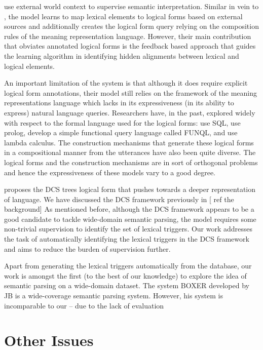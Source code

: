 \documentclass[11pt]{article}
\begin{document}
\cite{CGCR10, CGRR11} use external world context to supervise semantic interpretation. Similar in vein to \cite{CM08, LJK09}, the \cite{CGCR10} model learns to map lexical elements to logical forms based on external sources and additionally creates the logical form query relying on the composition rules of the meaning representation language. However, their main contribution that obviates annotated logical forms is the feedback based approach that guides the learning algorithm in identifying hidden alignments between lexical and logical elements.

An important limitation of the \cite{CGCR10} system is that although it does require explicit logical form annotations, their model still relies on the framework of the meaning representations language which lacks in its expressiveness (in its ability to express) natural language queries. Researchers have, in the past, explored widely with respect to the formal language used for the logical forms: \cite{GM09} use SQL, \cite{ZM96,TM01} use prolog, \cite{KWM05}  develop a simple functional query language called {\sc FUN}QL, and \cite{ZC05} use lambda calculus. The construction mechanisms that generate these logical forms in a compositional manner from the utterances have also been quite diverse. The logical forms and the construction mechanisms are in sort of orthogonal problems and hence the expressiveness of these models vary to a good degree.

\cite{LJK11} proposes the DCS trees logical form that pushes towards a deeper representation of language. %
We have discussed the DCS framework previously in [ ref the background]
As mentioned before, although the DCS framework appears to be a good candidate to tackle wide-domain semantic parsing, the model requires some non-trivial supervision to identify the set of lexical triggers.
Our work addresses the task of automatically identifying the lexical triggers in the DCS framework and aims to reduce the burden of supervision further.

Apart from generating the lexical triggers automatically from the database, our work is amongst the first (to the best of our knowledge) to explore the idea of semantic parsing on a wide-domain dataset. The system {\sc BOXER} developed by JB is a wide-coverage semantic parsing system. However, his system is incomparable to our -- due to the lack of evaluation



\section{Other Issues}
\end{document}
